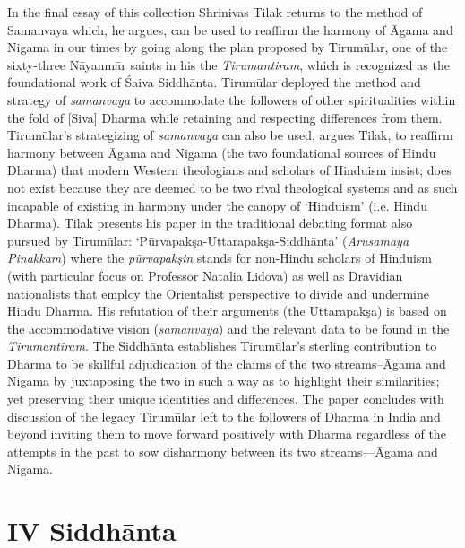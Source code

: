 In the final essay of this collection Shrinivas Tilak returns to the method of Samanvaya which, he argues, can be used to reaffirm the harmony of Āgama and Nigama in our times by going along the plan proposed by Tirumūlar, one of the sixty-three Nāyanmār saints in his the \textit{Tirumantiram}, which is recognized as the foundational work of Śaiva Siddhānta. Tirumūlar deployed the method and strategy of \textit{samanvaya} to accommodate the followers of other spiritualities within the fold of [Siva] Dharma while retaining and respecting differences from them. Tirumūlar’s strategizing of \textit{samanvaya} can also be used, argues Tilak, to reaffirm harmony between Āgama and Nigama (the two foundational sources of Hindu Dharma) that modern Western theologians and scholars of Hinduism insist; does not exist because they are deemed to be two rival theological systems and as such incapable of existing in harmony under the canopy of ‘Hinduism’ (i.e. Hindu Dharma). Tilak presents his paper in the traditional debating format also pursued by Tirumūlar: ‘Pūrvapakşa-Uttarapakşa-Siddhānta’ (\textit{Arusamaya Pinakkam}) where the \textit{pūrvapakşin} stands for non-Hindu scholars of Hinduism (with particular focus on Professor Natalia Lidova) as well as Dravidian nationalists that employ the Orientalist perspective to divide and undermine Hindu Dharma. His refutation of their arguments (the Uttarapakşa) is based on the accommodative vision (\textit{samanvaya}) and the relevant data to be found in the \textit{Tirumantiram}. The Siddhānta establishes Tirumūlar’s sterling contribution to Dharma to be skillful adjudication of the claims of the two streams--Āgama and Nigama by juxtaposing the two in such a way as to highlight their similarities; yet preserving their unique identities and differences. The paper concludes with discussion of the legacy Tirumūlar left to the followers of Dharma in India and beyond inviting them to move forward positively with Dharma regardless of the attempts in the past to sow disharmony between its two streams—Āgama and Nigama.


\section*{IV Siddhānta}

\vskip -6pt

